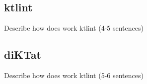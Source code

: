 \subsection{ktlint}
\par
Describe how does work ktlint (4-5 sentences)

\subsection{diKTat}
\par
Describe how does work ktlint (5-6 sentences)